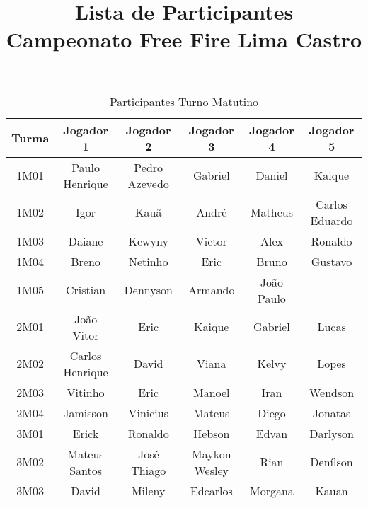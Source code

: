 \documentclass[10pt]{article}
\title{Lista de Participantes\\Campeonato Free Fire Lima Castro}
\begin{document}
    \maketitle

    \begin{table}[h!]
        \caption{Participantes Turno Matutino}
        \label{tab:part-matutino}
        \begin{center}
            \begin{tabular}{c|c|c|c|c|c}
                \hline
                \textbf{Turma} & \textbf{Jogador 1} & \textbf{Jogador 2} & \textbf{Jogador 3} & \textbf{Jogador 4} & \textbf{Jogador 5}\\ \hline
                1M01 & Paulo Henrique & Pedro Azevedo & Gabriel & Daniel & Kaique\\
                1M02 & Igor & Kauã & André & Matheus & Carlos Eduardo \\
                1M03 & Daiane & Kewyny & Victor & Alex & Ronaldo \\
                1M04 & Breno & Netinho & Eric & Bruno & Gustavo \\
                1M05 & Cristian & Dennyson & Armando & João Paulo & \\
                2M01 & João Vitor & Eric & Kaique & Gabriel & Lucas \\
                2M02 & Carlos Henrique & David & Viana & Kelvy & Lopes \\
                2M03 & Vitinho & Eric & Manoel & Iran & Wendson \\
                2M04 & Jamisson & Vinicius & Mateus & Diego & Jonatas \\
                3M01 & Erick & Ronaldo & Hebson & Edvan & Darlyson \\
                3M02 & Mateus Santos & José Thiago & Maykon Wesley & Rian & Denílson \\
                3M03 & David & Mileny & Edcarlos & Morgana & Kauan \\
                \hline
            \end{tabular}
        \end{center}
    \end{table}
\end{document}
